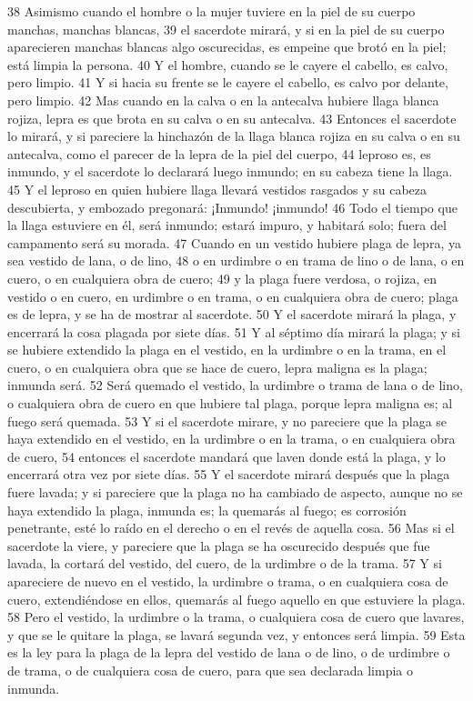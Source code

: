 38 Asimismo cuando el hombre o la mujer tuviere en la piel de su cuerpo manchas, manchas blancas,
39 el sacerdote mirará, y si en la piel de su cuerpo aparecieren manchas blancas algo oscurecidas, es empeine que brotó en la piel; está limpia la persona.
40 Y el hombre, cuando se le cayere el cabello, es calvo, pero limpio.
41 Y si hacia su frente se le cayere el cabello, es calvo por delante, pero limpio.
42 Mas cuando en la calva o en la antecalva hubiere llaga blanca rojiza, lepra es que brota en su calva o en su antecalva.
43 Entonces el sacerdote lo mirará, y si pareciere la hinchazón de la llaga blanca rojiza en su calva o en su antecalva, como el parecer de la lepra de la piel del cuerpo,
44 leproso es, es inmundo, y el sacerdote lo declarará luego inmundo; en su cabeza tiene la llaga.
45 Y el leproso en quien hubiere llaga llevará vestidos rasgados y su cabeza descubierta, y embozado pregonará: ¡Inmundo! ¡inmundo!
46 Todo el tiempo que la llaga estuviere en él, será inmundo; estará impuro, y habitará solo; fuera del campamento será su morada.
47 Cuando en un vestido hubiere plaga de lepra, ya sea vestido de lana, o de lino,
48 o en urdimbre o en trama de lino o de lana, o en cuero, o en cualquiera obra de cuero;
49 y la plaga fuere verdosa, o rojiza, en vestido o en cuero, en urdimbre o en trama, o en cualquiera obra de cuero; plaga es de lepra, y se ha de mostrar al sacerdote.
50 Y el sacerdote mirará la plaga, y encerrará la cosa plagada por siete días.
51 Y al séptimo día mirará la plaga; y si se hubiere extendido la plaga en el vestido, en la urdimbre o en la trama, en el cuero, o en cualquiera obra que se hace de cuero, lepra maligna es la plaga; inmunda será.
52 Será quemado el vestido, la urdimbre o trama de lana o de lino, o cualquiera obra de cuero en que hubiere tal plaga, porque lepra maligna es; al fuego será quemada.
53 Y si el sacerdote mirare, y no pareciere que la plaga se haya extendido en el vestido, en la urdimbre o en la trama, o en cualquiera obra de cuero,
54 entonces el sacerdote mandará que laven donde está la plaga, y lo encerrará otra vez por siete días.
55 Y el sacerdote mirará después que la plaga fuere lavada; y si pareciere que la plaga no ha cambiado de aspecto, aunque no se haya extendido la plaga, inmunda es; la quemarás al fuego; es corrosión penetrante, esté lo raído en el derecho o en el revés de aquella cosa.
56 Mas si el sacerdote la viere, y pareciere que la plaga se ha oscurecido después que fue lavada, la cortará del vestido, del cuero, de la urdimbre o de la trama.
57 Y si apareciere de nuevo en el vestido, la urdimbre o trama, o en cualquiera cosa de cuero, extendiéndose en ellos, quemarás al fuego aquello en que estuviere la plaga.
58 Pero el vestido, la urdimbre o la trama, o cualquiera cosa de cuero que lavares, y que se le quitare la plaga, se lavará segunda vez, y entonces será limpia.
59 Esta es la ley para la plaga de la lepra del vestido de lana o de lino, o de urdimbre o de trama, o de cualquiera cosa de cuero, para que sea declarada limpia o inmunda.

